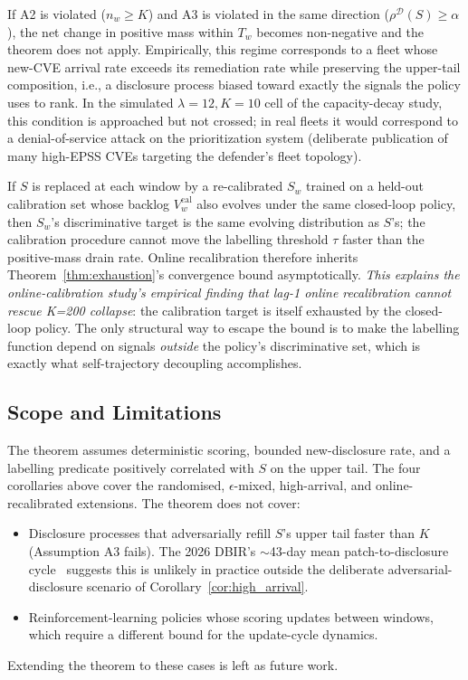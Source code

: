 \begin{corollary}
\label{cor:high_arrival}
If A2 is violated ($n_w \geq K$) and A3 is violated in the same
direction ($\rho^{\mathcal{D}}(S) \geq \alpha$), the net change in
positive mass within $T_w$ becomes non-negative and the theorem does
not apply. Empirically, this regime corresponds to a fleet whose
new-CVE arrival rate exceeds its remediation rate while preserving
the upper-tail composition, i.e., a disclosure process biased
toward exactly the signals the policy uses to rank. In the simulated
$\lambda = 12, K = 10$ cell of the capacity-decay study, this condition is approached
but not crossed; in real fleets it would correspond to a denial-of-service
attack on the prioritization system (deliberate publication of many
high-EPSS CVEs targeting the defender's fleet topology).
\end{corollary}

\begin{corollary}
\label{cor:calibration}
If $S$ is replaced at each window by a re-calibrated $S_w$ trained on
a held-out calibration set whose backlog $V_w^{\text{cal}}$ also evolves
under the same closed-loop policy, then $S_w$'s discriminative target
is the same evolving distribution as $S$'s; the calibration procedure
cannot move the labelling threshold $\tau$ faster than the
positive-mass drain rate. Online recalibration therefore inherits
Theorem~\ref{thm:exhaustion}'s convergence bound asymptotically.
\emph{This explains the online-calibration study's empirical finding that lag-1 online
recalibration cannot rescue K=200 collapse}:
the calibration target is itself exhausted by the closed-loop policy.
The only structural way to escape the bound is to make the labelling
function depend on signals \emph{outside} the policy's discriminative
set, which is exactly what self-trajectory decoupling accomplishes.
\end{corollary}

\subsection{Scope and Limitations}

The theorem assumes deterministic scoring, bounded new-disclosure rate,
and a labelling predicate positively correlated with $S$ on the upper
tail. The four corollaries above cover the randomised, $\epsilon$-mixed,
high-arrival, and online-recalibrated extensions. The theorem does
not cover:
\begin{itemize}
\item Disclosure processes that adversarially refill $S$'s upper tail
faster than $K$ (Assumption A3 fails). The 2026 DBIR's $\sim$43-day mean
patch-to-disclosure cycle~\cite{verizon2026dbir} suggests this is
unlikely in practice
outside the deliberate adversarial-disclosure scenario of
Corollary~\ref{cor:high_arrival}.
\item Reinforcement-learning policies whose scoring updates between
windows, which require a different bound for the update-cycle dynamics.
\end{itemize}
Extending the theorem to these cases is left as future work.
